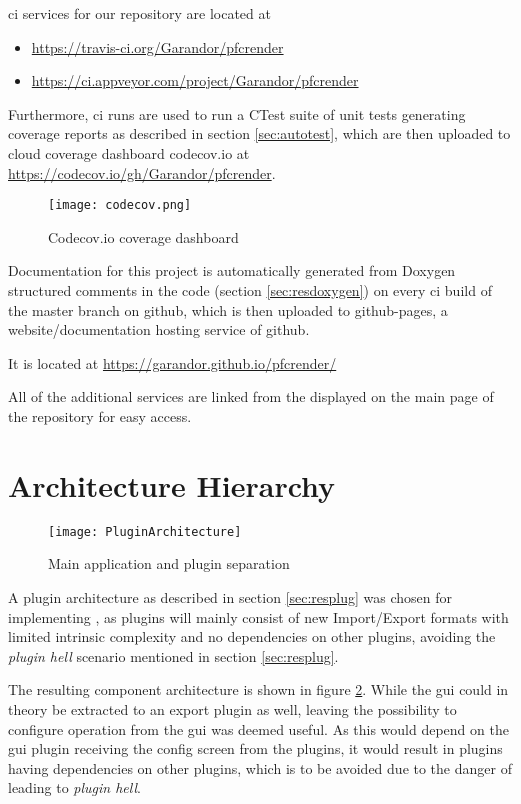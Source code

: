 \gls{ci} services for our repository are located at
\begin{itemize}
	\item \url{https://travis-ci.org/Garandor/pfcrender}
	\item \url{https://ci.appveyor.com/project/Garandor/pfcrender}
\end{itemize}

Furthermore, \gls{ci} runs are used to run a CTest suite of unit tests generating \gls{coverage} reports as described in section \ref{sec:autotest}, which are then uploaded to cloud coverage dashboard codecov.io at \url{https://codecov.io/gh/Garandor/pfcrender}.

\begin{figure}
	\texttt{[image: codecov.png]}
	\caption{Codecov.io coverage dashboard}
	\label{fig:codecov}
\end{figure}

Documentation for this project is automatically generated from Doxygen structured comments in the code (section \ref{sec:resdoxygen}) on every \gls{ci} build of the master branch on \gls{github}, which is then uploaded to github-pages, a website/documentation hosting service of \gls{github}.

It is located at \url{https://garandor.github.io/pfcrender/}

All of the additional services are linked from the  displayed on the main page of the repository for easy access.

\section{Architecture Hierarchy}\label{sec:archplug}
\begin{figure}
	\texttt{[image: PluginArchitecture]}
	\caption{Main application and plugin separation}
	\label{fig:comp}
\end{figure}
A plugin architecture as described in section \ref{sec:resplug} was chosen for implementing , as plugins will mainly consist of new Import/Export formats with limited intrinsic complexity and no dependencies on other plugins, avoiding the \textit{plugin hell} scenario mentioned in section \ref{sec:resplug}.

The resulting component architecture is shown in figure \ref{fig:comp}. While the \gls{gui} could in theory be extracted to an export plugin as well, leaving the possibility to configure operation from the \gls{gui} was deemed useful. As this would depend on the \gls{gui} plugin receiving the  config screen from the plugins, it would result in plugins having dependencies on other plugins, which is to be avoided due to the danger of leading to \textit{plugin hell}.

